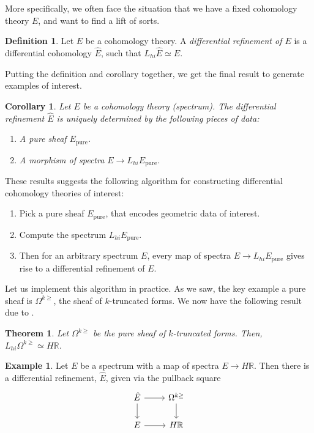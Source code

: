 \documentclass[10pt]{amsart}
\newcommand{\bR}{\mathbb{R}}
\newtheorem{theorem}[equation]{Theorem}
\newtheorem{corollary}[equation]{Corollary}
\theoremstyle{definition}
\newtheorem{definition}[equation]{Definition}
\newtheorem{example}[equation]{Example}
\theoremstyle{remark}
\numberwithin{equation}{section}
\begin{document}
More specifically, we often face the situation that we have a fixed cohomology theory $E$, and want to find a lift of sorts.

\begin{definition}
  Let $E$ be a cohomology theory. A \emph{differential refinement of $E$} is a differential cohomology $\hat{E}$, such that $L_{hi}\hat{E} \simeq E$.
\end{definition}

Putting the definition and corollary together, we get the final result to generate examples of interest.

\begin{corollary}
 Let $E$ be a cohomology theory (spectrum). The differential refinement $\hat{E}$ is uniquely determined by the following pieces of data:
\begin{enumerate}
  \item A pure sheaf $E_{\mathrm{pure}}$.
  \item A morphism of spectra $E \to L_{hi}E_{\mathrm{pure}}$.
\end{enumerate}
\end{corollary}

These results suggests the following algorithm for constructing differential cohomology theories of interest:
\begin{enumerate}
  \item Pick a pure sheaf $E_{\mathrm{pure}}$, that encodes geometric data of interest.
  \item Compute the spectrum $L_{hi}E_{\mathrm{pure}}$.
  \item Then for an arbitrary spectrum $E$, every map of spectra $E \to L_{hi}E_{\mathrm{pure}}$ gives rise to a differential refinement of $E$.
\end{enumerate}

Let us implement this algorithm in practice. As we saw, the key example a pure sheaf is $\Omega^{k \geq}$, the sheaf of $k$-truncated forms. We now have the following result due to \cite{bunkenikolausvoelkl2016diffcoh}.

\begin{theorem}
  Let $\Omega^{k \geq}$ be the pure sheaf of $k$-truncated forms. Then, $L_{hi}\Omega^{k \geq} \simeq H\bR$. 
\end{theorem}

\begin{example}
 Let $E$ be a spectrum with a map of spectra $E \to H\bR$. Then there is a differential refinement, $\hat{E}$, given via the pullback square 
 \[ 
 \begin{tikzcd}
 \hat{E} \arrow{r} \arrow{d} & \Omega^{k \geq}  \arrow{d} \\
 E \arrow{r} & H\bR
 \end{tikzcd}
 \]
\end{example}
\end{document}
